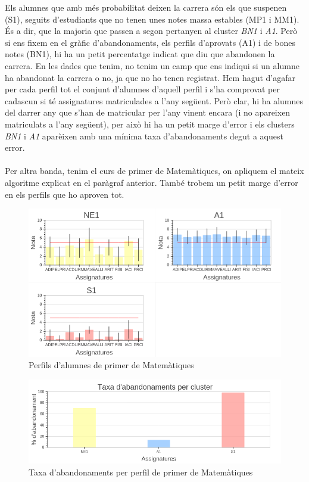 \documentclass[12pt,a4paper,catalan]{article}
\begin{document}
Els alumnes que amb més probabilitat deixen la carrera són els que suspenen (S1), seguits d'estudiants que no tenen unes notes massa estables (MP1 i MM1). És a dir, que la majoria que passen a segon pertanyen al cluster \textit{BN1} i \textit{A1}. Però si ens fixem en el gràfic d'abandonaments, els perfils d'aprovats (A1) i de bones notes (BN1), hi ha un petit percentatge indicat que diu que abandonen la carrera. En les dades que tenim, no tenim un camp que ens indiqui si un alumne ha abandonat la carrera o no, ja que no ho tenen registrat. Hem hagut d'agafar per cada perfil tot el conjunt d'alumnes d'aquell perfil i s'ha comprovat per cadascun si té assignatures matriculades a l'any següent. Però clar, hi ha alumnes del darrer any que s'han de matricular per l'any vinent encara (i no apareixen matriculats a l'any següent), per això hi ha un petit marge d'error i els clusters \textit{BN1} i \textit{A1} aparèixen amb una mínima taxa d'abandonaments degut a aquest error.
\\
\\
Per altra banda, tenim el curs de primer de Matemàtiques, on apliquem el mateix algoritme explicat en el paràgraf anterior. També trobem un petit marge d'error en els perfils que ho aproven tot.

\begin{figure}[h]
\centering
\includegraphics[width=0.9\linewidth]{img/perfils_primer_mates.png}
\caption{Perfils d'alumnes de primer de Matemàtiques}
\end{figure}

\begin{figure}[h]
\centering
\includegraphics[width=.9\linewidth]{img/abandonaments_primer_mates.png}
\caption{Taxa d'abandonaments per perfil de primer de Matemàtiques}
\label{fig:tappm}
\end{figure}
\end{document}
